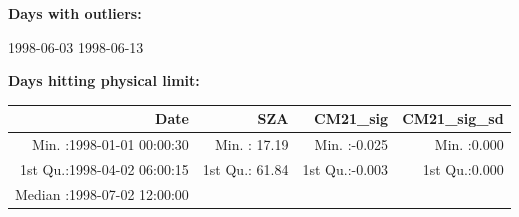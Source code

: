 \documentclass[
  10pt,
  a4paper,oneside]{article}
\begin{document}
\normalsize

\textbf{Days with outliers:}

1998-06-03 1998-06-13

\textbf{Days hitting physical limit:}

\footnotesize

\begin{longtable}[]{@{}rrrr@{}}
\toprule
\begin{minipage}[b]{0.33\columnwidth}\raggedleft
Date\strut
\end{minipage} & \begin{minipage}[b]{0.19\columnwidth}\raggedleft
SZA\strut
\end{minipage} & \begin{minipage}[b]{0.19\columnwidth}\raggedleft
CM21\_sig\strut
\end{minipage} & \begin{minipage}[b]{0.19\columnwidth}\raggedleft
CM21\_sig\_sd\strut
\end{minipage}\tabularnewline
\midrule
\endhead
\begin{minipage}[t]{0.33\columnwidth}\raggedleft
Min. :1998-01-01 00:00:30\strut
\end{minipage} & \begin{minipage}[t]{0.19\columnwidth}\raggedleft
Min. : 17.19\strut
\end{minipage} & \begin{minipage}[t]{0.19\columnwidth}\raggedleft
Min. :-0.025\strut
\end{minipage} & \begin{minipage}[t]{0.19\columnwidth}\raggedleft
Min. :0.000\strut
\end{minipage}\tabularnewline
\begin{minipage}[t]{0.33\columnwidth}\raggedleft
1st Qu.:1998-04-02 06:00:15\strut
\end{minipage} & \begin{minipage}[t]{0.19\columnwidth}\raggedleft
1st Qu.: 61.84\strut
\end{minipage} & \begin{minipage}[t]{0.19\columnwidth}\raggedleft
1st Qu.:-0.003\strut
\end{minipage} & \begin{minipage}[t]{0.19\columnwidth}\raggedleft
1st Qu.:0.000\strut
\end{minipage}\tabularnewline
\begin{minipage}[t]{0.33\columnwidth}\raggedleft
Median :1998-07-02 12:00:00\strut
\end{minipage} & \begin{minipage}[t]{0.19\columnwidth}\raggedleft

\end{minipage}
\end{longtable}
\end{document}
